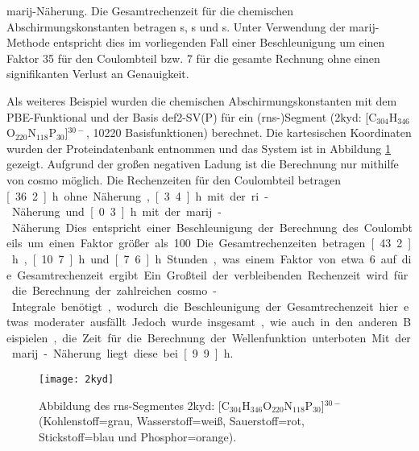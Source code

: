 \ac{marij}-Näherung. Die Gesamtrechenzeit für die chemischen Abschirmungskonstanten betragen \unit[4610]{s}, \unit[741]{s} und \unit[633]{s}. Unter Verwendung der \ac{marij}-Methode entspricht dies im vorliegenden Fall einer Beschleunigung um einen Faktor 35 für den Coulombteil bzw. 7 für die gesamte Rechnung ohne einen signifikanten Verlust an Genauigkeit. 

Als weiteres Beispiel wurden die chemischen Abschirmungskonstanten mit dem PBE-Funktional und der Basis def2-SV(P) für ein \mbox{(\acs{rns}-)}Segment (2kyd\supercite{2kydstructure}: [C$_{304}$H$_{346}$O$_{220}$N$_{118}$P$_{30}$]$^{30-}$, 10220 Basisfunktionen) berechnet. Die kartesischen Koordinaten wurden der Proteindatenbank entnommen und das System ist in Abbildung \ref{abb:2kyd} gezeigt. Aufgrund der großen negativen Ladung ist die Berechnung nur mithilfe von \ac{cosmo} möglich. Die Rechenzeiten für den Coulombteil betragen \unit[36.2]{h} ohne Näherung, \unit[3.4]{h} mit der \ac{ri}-Näherung und \unit[0.3]{h} mit der \ac{marij}-Näherung. Dies entspricht einer Beschleunigung der Berechnung des Coulombteils um einen Faktor größer als 100. Die Gesamtrechenzeiten betragen \unit[43.2]{h}, \unit[10.7]{h} und \unit[7.6]{h} Stunden, was einem Faktor von etwa 6 auf die Gesamtrechenzeit ergibt. Ein Großteil der verbleibenden Rechenzeit wird für die Berechnung der zahlreichen \ac{cosmo}-Integrale benötigt, wodurch die Beschleunigung der Gesamtrechenzeit hier etwas moderater ausfällt. Jedoch wurde insgesamt, wie auch in den anderen Beispielen, die Zeit für die Berechnung der Wellenfunktion unterboten. Mit der \ac{marij}-Näherung liegt diese bei \unit[9.9]{h}.

\begin{figure}[ht!]
	\centering
	\texttt{[image: 2kyd]}
	\captionsetup{figurewithin = chapter}
	\captionsetup{font=small, labelfont=bf}\caption[{Abbildung eines \ac{rns}-Segmentes}]{Abbildung des \ac{rns}-Segmentes 2kyd\supercite{2kydstructure}: [C$_{304}$H$_{346}$O$_{220}$N$_{118}$P$_{30}$]$^{30-}$ (Kohlenstoff=grau, Wasserstoff=weiß, Sauerstoff=rot, Stickstoff=blau und Phosphor=orange).}
\label{abb:2kyd}
\end{figure}

